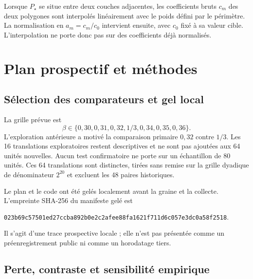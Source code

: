 \documentclass[11pt,a4paper]{article}
\newcommand{\sha}[1]{{\small\ttfamily\nolinkurl{#1}}}
\begin{document}
Lorsque $P_\star$ se situe entre deux couches adjacentes, les coefficients bruts $c_m$ des deux polygones sont interpolés linéairement avec le poids défini par le périmètre. La normalisation en $a_m=c_m/c_0$ intervient ensuite, avec $c_0$ fixé à sa valeur cible. L'interpolation ne porte donc pas sur des coefficients déjà normalisés.

\section{Plan prospectif et méthodes}

\subsection{Sélection des comparateurs et gel local}

La grille prévue est
\begin{equation}
  \beta\in\{0{,}30,0{,}31,0{,}32,1/3,0{,}34,0{,}35,0{,}36\}.
\end{equation}
L'exploration antérieure a motivé la comparaison primaire $0{,}32$ contre $1/3$. Les 16 translations exploratoires restent descriptives et ne sont pas ajoutées aux 64 unités nouvelles. Aucun test confirmatoire ne porte sur un échantillon de 80 unités. Ces 64 translations sont distinctes, tirées sans remise sur la grille dyadique de dénominateur $2^{20}$ et excluent les 48 paires historiques.

Le plan et le code ont été gelés localement avant la graine et la collecte. L'empreinte SHA-256 du manifeste gelé est
\begin{center}
\sha{023b69c57501ed27ccba892b0e2c2afee88fa1621f711d6c057e3dc0a58f2518}.
\end{center}
Il s'agit d'une trace prospective locale ; elle n'est pas présentée comme un préenregistrement public ni comme un horodatage tiers.

\subsection{Perte, contraste et sensibilité empirique}
\end{document}
